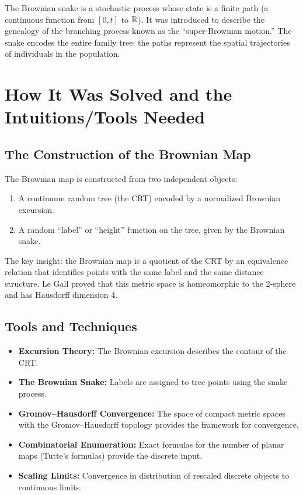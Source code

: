 The Brownian snake is a stochastic process whose state is a finite path (a continuous function from $[0,t]$ to $\mathbb{R}$). It was introduced to describe the genealogy of the branching process known as the ``super-Brownian motion.'' The snake encodes the entire family tree: the paths represent the spatial trajectories of individuals in the population.

\section{How It Was Solved and the Intuitions/Tools Needed}

\subsection{The Construction of the Brownian Map}

The Brownian map is constructed from two independent objects:
\begin{enumerate}
    \item A continuum random tree (the CRT) encoded by a normalized Brownian excursion.
    \item A random ``label'' or ``height'' function on the tree, given by the Brownian snake.
\end{enumerate}

The key insight: the Brownian map is a quotient of the CRT by an equivalence relation that identifies points with the same label and the same distance structure. Le Gall proved that this metric space is homeomorphic to the 2-sphere and has Hausdorff dimension 4.

\subsection{Tools and Techniques}

\begin{itemize}
    \item \textbf{Excursion Theory:} The Brownian excursion describes the contour of the CRT.
    \item \textbf{The Brownian Snake:} Labels are assigned to tree points using the snake process.
    \item \textbf{Gromov--Hausdorff Convergence:} The space of compact metric spaces with the Gromov--Hausdorff topology provides the framework for convergence.
    \item \textbf{Combinatorial Enumeration:} Exact formulas for the number of planar maps (Tutte's formulas) provide the discrete input.
    \item \textbf{Scaling Limits:} Convergence in distribution of rescaled discrete objects to continuous limits.
\end{itemize}

